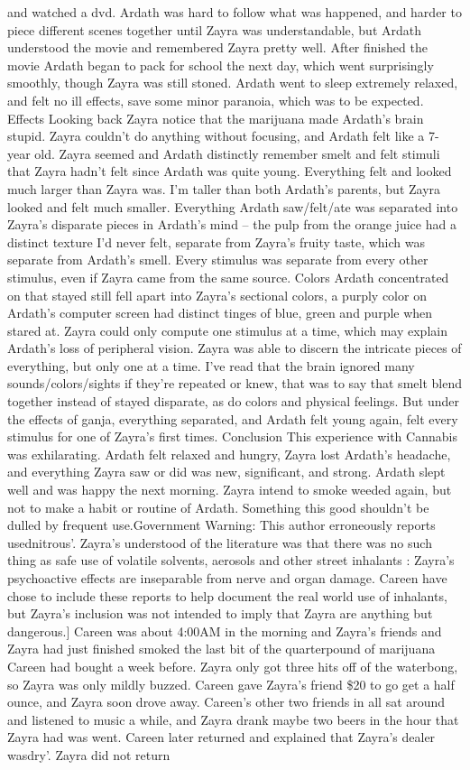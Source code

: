 \documentclass[12pt]{book}
\begin{document}
and watched a dvd. Ardath was hard to follow what was happened, and harder to piece different scenes together until Zayra was understandable, but Ardath understood the movie and remembered Zayra pretty well. After finished the movie Ardath began to pack for school the next day, which went surprisingly smoothly, though Zayra was still stoned. Ardath went to sleep extremely relaxed, and felt no ill effects, save some minor paranoia, which was to be expected. Effects Looking back Zayra notice that the marijuana made Ardath's brain stupid. Zayra couldn't do anything without focusing, and Ardath felt like a 7-year old. Zayra seemed  and Ardath distinctly remember smelt and felt stimuli that Zayra hadn't felt since Ardath was quite young. Everything felt and looked much larger than Zayra was. I'm taller than both Ardath's parents, but Zayra looked and felt much smaller. Everything Ardath saw/felt/ate was separated into Zayra's disparate pieces in Ardath's mind -- the pulp from the orange juice had a distinct texture I'd never felt, separate from Zayra's fruity taste, which was separate from Ardath's smell. Every stimulus was separate from every other stimulus, even if Zayra came from the same source. Colors Ardath concentrated on that stayed still fell apart into Zayra's sectional colors, a purply color on Ardath's computer screen had distinct tinges of blue, green and purple when stared at. Zayra could only compute one stimulus at a time, which may explain Ardath's loss of peripheral vision. Zayra was able to discern the intricate pieces of everything, but only one at a time. I've read that the brain ignored many sounds/colors/sights if they're repeated or knew, that was to say that smelt blend together instead of stayed disparate, as do colors and physical feelings. But under the effects of ganja, everything separated, and Ardath felt young again, felt every stimulus for one of Zayra's first times. Conclusion This experience with Cannabis was exhilarating. Ardath felt relaxed and hungry, Zayra lost Ardath's headache, and everything Zayra saw or did was new, significant, and strong. Ardath slept well and was happy the next morning. Zayra intend to smoke weeded again, but not to make a habit or routine of Ardath. Something this good shouldn't be dulled by frequent use.Government Warning: This author erroneously reports usednitrous'. Zayra's understood of the literature was that there was no such thing as safe use of volatile solvents, aerosols and other street inhalants : Zayra's psychoactive effects are inseparable from nerve and organ damage. Careen have chose to include these reports to help document the real world use of inhalants, but Zayra's inclusion was not intended to imply that Zayra are anything but dangerous.] Careen was about 4:00AM in the morning and Zayra's friends and Zayra had just finished smoked the last bit of the quarterpound of marijuana Careen had bought a week before. Zayra only got three hits off of the waterbong, so Zayra was only mildly buzzed. Careen gave Zayra's friend \$20 to go get a half ounce, and Zayra soon drove away. Careen's other two friends in all sat around and listened to music a while, and Zayra drank maybe two beers in the hour that Zayra had was went. Careen later returned and explained that Zayra's dealer wasdry'. Zayra did not return 
\end{document}
